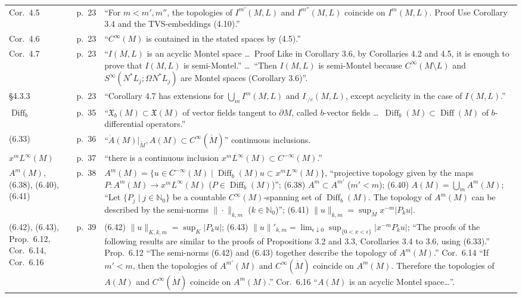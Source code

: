 \documentclass[11pt]{article}
\newcommand{\N}{\mathbb{N}}
\newcommand{\Diff}{\operatorname{Diff}}
\newcommand{\Mo}{\mathring{M}}
\begin{document}
{\begin{longtable}{@{}p{}p{}p{}@{}}
Cor.~4.5 & p.~23 & ``For $m<m',m''$, the topologies of $I^{m'}(M,L)$ and $I^{m''}(M,L)$ coincide on $I^m(M,L)$. Proof Use Corollary 3.4 and the TVS-embeddings (4.10).''\\
Cor.~4.6 & p.~23 & ``$C^\infty(M)$ is contained in the stated spaces by (4.5).''\\
Cor.~4.7 & p.~23 & ``$I(M,L)$ is an acyclic Montel space \dots\ Proof Like in Corollary 3.6, by Corollaries 4.2 and 4.5, it is enough to prove that $I(M,L)$ is semi-Montel.'' \dots\ ``Then $I(M,L)$ is semi-Montel because $C^\infty(M\setminus L)$ and $S^\infty(N^*L_j;\Omega N^*L_j)$ are Montel spaces (Corollary 3.6)''.\\
\S4.3.3 & p.~23 & ``Corollary 4.7 has extensions for $\bigcup_mI^m(M,L)$ and $I_{\cdot/c}(M,L)$, except acyclicity in the case of $I(M,L)$.''\\
$\Diff_b$ & p.~35 & ``$\mathfrak X_b(M)\subset\mathfrak X(M)$ of vector fields tangent to $\partial M$, called $b$-vector fields \dots\ $\Diff_b(M)\subset\Diff(M)$ of $b$-differential operators.''\\
(6.33) & p.~36 & ``$\dot A(M)|_{\Mo},A(M)\subset C^\infty(\Mo)$'' continuous inclusions.\\
$x^mL^\infty(M)$ & p.~37 & ``there is a continuous inclusion $x^mL^\infty(M)\subset C^{-\infty}(M)$.''\\
$A^m(M)$, (6.38), (6.40), (6.41) & p.~38 & $A^m(M)=\{u\in C^{-\infty}(M)\mid\Diff_b(M)u\subset x^mL^\infty(M)\}$, ``projective topology given by the maps $P\colon A^m(M)\to x^mL^\infty(M)$ ($P\in\Diff_b(M)$)''; (6.38) $A^m\subset A^{m'}$ ($m'<m$); (6.40) $A(M)=\bigcup_mA^m(M)$; ``Let $\{P_j\mid j\in\N_0\}$ be a countable $C^\infty(M)$-spanning set of $\Diff_b(M)$. The topology of $A^m(M)$ can be described by the semi-norms $\|\cdot\|_{k,m}$ ($k\in\N_0$)''; (6.41) $\|u\|_{k,m}=\sup_{\Mo}x^{-m}|P_ku|$.\\
(6.42), (6.43), Prop.~6.12, Cor.~6.14, Cor.~6.16 & p.~39 & (6.42) $\|u\|_{K,k,m}=\sup_K|P_ku|$; (6.43) $\|u\|'_{k,m}=\lim_{\epsilon\downarrow0}\sup_{\{0<x<\epsilon\}}|x^{-m}P_ku|$; ``The proofs of the following results are similar to the proofs of Propositions 3.2 and 3.3, Corollaries 3.4 to 3.6, using (6.33).'' Prop.~6.12 ``The semi-norms (6.42) and (6.43) together describe the topology of $A^m(M)$.'' Cor.~6.14 ``If $m'<m$, then the topologies of $A^{m'}(M)$ and $C^\infty(\Mo)$ coincide on $A^m(M)$. Therefore the topologies of $A(M)$ and $C^\infty(\Mo)$ coincide on $A^m(M)$.'' Cor.~6.16 ``$A(M)$ is an acyclic Montel space\dots''.\\

\end{longtable}}
\end{document}
